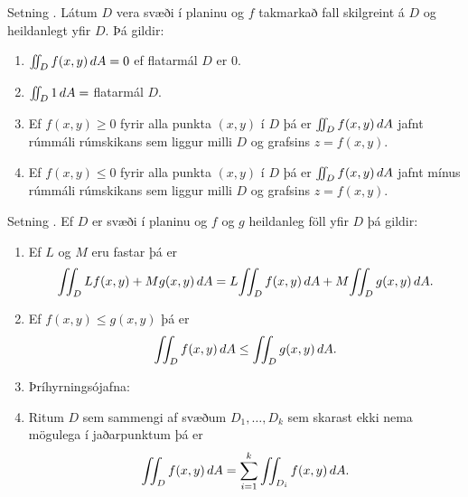 \begin{frame}{} 

\begin {block}{Setning \kaflanr.}
Látum $D$ vera svæði í planinu og $f$ takmarkað
fall skilgreint á $D$ og heildanlegt yfir $D$.  Þá gildir:

\begin {enumerate}
 \item $\int\!\!\!\int_D f(x,y)\,dA=0$ ef flatarmál $D$ er 0.
 \item $\int\!\!\!\int_D 1\,dA=$ flatarmál $D$.
 \item Ef $f(x,y)\geq 0$ fyrir alla punkta $(x,y)$ í $D$ þá er 
$\int\!\!\!\int_D f(x,y)\,dA$ jafnt rúmmáli rúmskikans sem liggur milli $D$ og
grafsins $z=f(x,y)$.
\item Ef $f(x,y)\leq 0$ fyrir alla punkta $(x,y)$ í $D$ þá er 
$\int\!\!\!\int_D f(x,y)\,dA$ jafnt mínus rúmmáli rúmskikans sem liggur milli $D$ og
grafsins $z=f(x,y)$.
\end {enumerate}

\end{block}

\end{frame}


\begin{frame}{} 

\begin {block}{Setning \kaflanr.}
Ef $D$ er svæði í planinu og $f$ og $g$
heildanleg föll yfir $D$ þá gildir:

\begin {enumerate}
 \item  Ef $L$ og $M$ eru fastar þá er
$$\tvint_D Lf(x,y)+Mg(x,y)\,dA=L\!\tvint_D f(x,y)\,dA+M\!\tvint_D
g(x,y)\,dA.$$
\item  Ef $f(x,y)\leq g(x,y)$ þá er 
$$\int\!\!\!\int_D f(x,y)\,dA\leq \int\!\!\!\int_Dg(x,y)\,dA.$$

\item  Þríhyrningsójafna: 

\item  Ritum $D$ sem sammengi af svæðum $D_1,\ldots, D_k$ sem skarast
ekki nema mögulega í jaðarpunktum þá er
$$\int\!\!\!\int_D f(x,y)\,dA=\sum_{i=1}^k\int\!\!\!\int_{D_i}f(x,y)\,dA.$$
\end {enumerate}

\end{block}

\end{frame}


